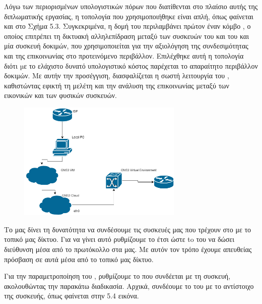 Λόγω των περιορισμένων υπολογιστικών πόρων που διατίθενται στο πλαίσιο αυτής της διπλωματικής εργασίας, η τοπολογία που χρησιμοποιήθηκε είναι απλή, όπως φαίνεται και στο Σχήμα 5.3. Συγκεκριμένα, η δομή του  περιλαμβάνει πρώτον έναν κόμβο , ο οποίος επιτρέπει τη δικτυακή αλληλεπίδραση μεταξύ των συσκευών του  και του  και μία συσκευή δοκιμών, που χρησιμοποιείται για την αξιολόγηση της συνδεσιμότητας και της επικοινωνίας στο προτεινόμενο περιβάλλον. Επιλέχθηκε αυτή η τοπολογία διότι µε το ελάχιστο δυνατό υπολογιστικό κόστος παρέχεται το απαραίτητο περιβάλλον δοκιμών.
Με αυτήν την προσέγγιση, διασφαλίζεται η σωστή λειτουργία του , καθιστώντας εφικτή τη μελέτη και την ανάλυση της επικοινωνίας μεταξύ των εικονικών και των φυσικών συσκευών.

\FloatBarrier

\begin{figure}[htb]
	\centering
	\includegraphics[width=0.7\textwidth]{graphics/diagram.drawio.png}
	\caption{ }
\end{figure}

\FloatBarrier

Το  μας δίνει τη δυνατότητα να συνδέσουμε τις συσκευές μας που τρέχουν στο  με το τοπικό μας δίκτυο. Για να γίνει αυτό ρυθμίζουμε το  έτσι ώστε to  του να δώσει  διεύθυνση μέσα από το  πρωτόκολλο στα  μας. Με αυτόν τον τρόπο έχουμε απευθείας πρόσβαση σε αυτά μέσα από το τοπικό μας δίκτυο.

Για την παραμετροποίηση του , ρυθμίζουμε το  που συνδέεται με τη συσκευή, ακολουθώντας την παρακάτω διαδικασία. Αρχικά, συνδέουμε το  του  με το αντίστοιχο  της συσκευής, όπως φαίνεται στην 5.4 εικόνα. 

